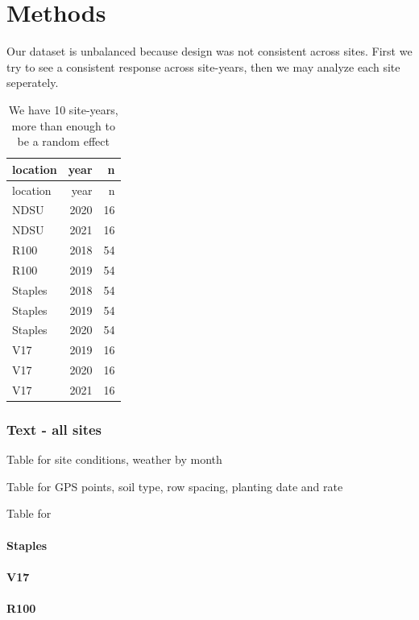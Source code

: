 \documentclass[
  letterpaper,
  DIV=11,
  numbers=noendperiod]{scrartcl}
\let\oldparagraph\paragraph
\renewcommand{\paragraph}[1]{\oldparagraph{#1}\mbox{}}
\begin{document}
\hypertarget{methods}{%
\section{Methods}\label{methods}}

Our dataset is unbalanced because design was not consistent across
sites. First we try to see a consistent response across site-years, then
we may analyze each site seperately.

\begin{longtable}[]{@{}lrr@{}}
\caption{We have 10 site-years, more than enough to be a random
effect}\tabularnewline
\toprule()
location & year & n \\
\midrule()
\endfirsthead
\toprule()
location & year & n \\
\midrule()
\endhead
NDSU & 2020 & 16 \\
NDSU & 2021 & 16 \\
R100 & 2018 & 54 \\
R100 & 2019 & 54 \\
Staples & 2018 & 54 \\
Staples & 2019 & 54 \\
Staples & 2020 & 54 \\
V17 & 2019 & 16 \\
V17 & 2020 & 16 \\
V17 & 2021 & 16 \\
\bottomrule()
\end{longtable}

\hypertarget{text---all-sites}{%
\subsubsection{Text - all sites}\label{text---all-sites}}

Table for site conditions, weather by month

Table for GPS points, soil type, row spacing, planting date and rate

Table for

\hypertarget{staples}{%
\paragraph{Staples}\label{staples}}

\hypertarget{v17}{%
\paragraph{V17}\label{v17}}

\hypertarget{r100}{%
\paragraph{R100}\label{r100}}
\end{document}
